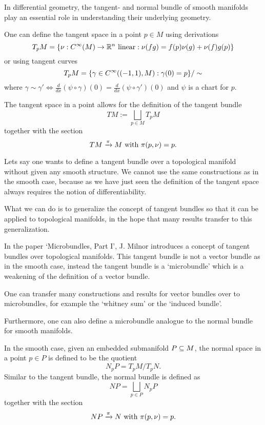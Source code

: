 \begin{myparagraph}
    In differential geometry,
    the tangent- and normal bundle of smooth manifolds
    play an essential role in understanding their underlying geometry.

    One can define the tangent space
    in a point $p \in M$ using derivations
    \[ T_p M = \{\nu: C^\infty(M) \to \mathbb{R}^n \text{ linear}:\nu(fg) = f(p)\nu(g) + \nu(f)g(p)\} \]    
    or using tangent curves
    \[ T_p M = \{\gamma \in C^\infty((-1, 1), M):\gamma(0) = p \} / \sim \]
    where $\gamma \sim \gamma' \iff \frac{d}{dx}(\psi \circ \gamma)(0) = \frac{d}{dx}(\psi \circ \gamma')(0)$
    and $\psi$ is a chart for $p$.
    
    The tangent space in a point allows for the definition of the tangent bundle
    \[ TM := \bigsqcup_{p \in M} T_p M\]
    together with the section
    \[ TM \xrightarrow{\pi} M \text{ with } \pi(p, \nu) = p. \]

    Lets say one wants to define a tangent bundle over a topological manifold
    without given any smooth structure.
    We cannot use the same constructions as in the smooth case, because
    as we have just seen the definition of
    the tangent space always requires the notion of differentiability.

    What we can do is to generalize the concept of tangent bundles
    so that it can be applied to topological manifolds,
    in the hope that many results transfer to this generalization.

    In the paper `Microbundles, Part I', J. Milnor introduces a concept
    of tangent bundles over topological manifolds.
    This tangent bundle is not a vector bundle as in the smooth case,
    instead the tangent bundle is a `microbundle'
    which is a weakening of the definition of a vector bundle.

    One can transfer many constructions and results for
    vector bundles over to microbundles,
    for example the `whitney sum' or the `induced bundle'. 

    Furthermore, one can also define a microbundle analogue
    to the normal bundle for smooth manifolds.

    In the smooth case, given an embedded submanifold $P \subseteq{} M$,
    the normal space in a point $p \in P$
    is defined to be the quotient
    \[ N_p P = T_p M / T_p N. \]
    Similar to the tangent bundle, the normal bundle is defined as
    \[ NP  = \bigsqcup_{p \in P} N_p P \]
    together with the section
    \[ NP \xrightarrow{\pi} N \text{ with } \pi(p, \nu) = p. \]
    

\end{myparagraph}
